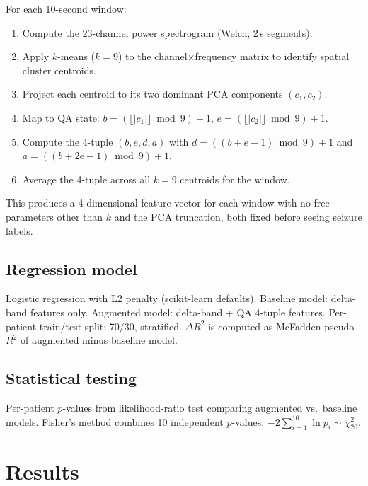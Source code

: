\documentclass[11pt]{article}
\begin{document}
For each 10-second window:
\begin{enumerate}[label=(\arabic*)]
  \item Compute the 23-channel power spectrogram (Welch, 2\,s segments).
  \item Apply $k$-means ($k=9$) to the channel$\times$frequency matrix to
        identify spatial cluster centroids.
  \item Project each centroid to its two dominant PCA components $(c_1, c_2)$.
  \item Map to QA state: $b = (\lfloor |c_1| \rfloor \bmod 9) + 1$,
        $e = (\lfloor |c_2| \rfloor \bmod 9) + 1$.
  \item Compute the 4-tuple $(b, e, d, a)$ with
        $d = ((b+e-1)\bmod 9)+1$ and $a = ((b+2e-1)\bmod 9)+1$.
  \item Average the 4-tuple across all $k=9$ centroids for the window.
\end{enumerate}
This produces a 4-dimensional feature vector for each window
with no free parameters other than $k$ and the PCA truncation,
both fixed before seeing seizure labels.

\subsection{Regression model}

Logistic regression with L2 penalty (scikit-learn defaults).
Baseline model: delta-band features only.
Augmented model: delta-band + QA 4-tuple features.
Per-patient train/test split: 70/30, stratified.
$\Delta R^2$ is computed as McFadden pseudo-$R^2$ of augmented minus baseline model.

\subsection{Statistical testing}

Per-patient $p$-values from likelihood-ratio test comparing augmented vs.\ baseline
models.  Fisher's method combines 10 independent $p$-values:
$-2 \sum_{i=1}^{10} \ln p_i \sim \chi^2_{20}$.

\section{Results}\label{sec:results}
\end{document}

